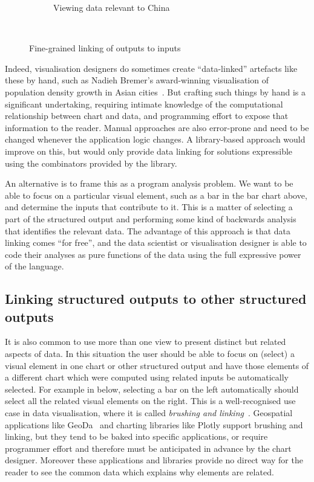 \begin{figure}[H]
\begin{subfigure}[b]{0.45\textwidth}
      \caption{Viewing data relevant to China}
   \end{subfigure}\\
   \begin{subfigure}{0.65\textwidth}
      \small
      
   \end{subfigure}
   \caption{Fine-grained linking of outputs to inputs}
   \label{fig:introduction:data-linking}
\end{figure}

Indeed, visualisation designers do sometimes create ``data-linked'' artefacts like these by hand, such as Nadieh Bremer's award-winning visualisation of population density growth in Asian cities~\cite{bremer15}. But crafting such things by hand is a significant undertaking, requiring intimate knowledge of the computational relationship between chart and data, and programming effort to expose that information to the reader. Manual approaches are also error-prone and need to be changed whenever the application logic changes. A library-based approach would improve on this, but would only provide data linking for solutions expressible using the combinators provided by the library.

An alternative is to frame this as a program analysis problem. We want to be able to focus on a particular visual element, such as a bar in the bar chart above, and determine the inputs that contribute to it. This is a matter of selecting a part of the structured output and performing some kind of backwards analysis that identifies the relevant data. The advantage of this approach is that data linking comes ``for free'', and the data scientist or visualisation designer is able to code their analyses as pure functions of the data using the full expressive power of the language.

\subsection{Linking structured outputs to other structured outputs}

 It is also common to use more than one view to present distinct but related aspects of data. In this situation the user should be able to focus on (select) a visual element in one chart or other structured output and have those elements of a different chart which were computed using related inputs be automatically selected. For example in  below, selecting a bar on the left automatically should select all the related visual elements on the right. This is a well-recognised use case in data visualisation, where it is called \emph{brushing and linking}~\cite{becker87}. Geospatial applications like GeoDa~\cite{anselin06} and charting libraries like Plotly support brushing and linking, but they tend to be baked into specific applications, or require programmer effort and therefore must be anticipated in advance by the chart designer. Moreover these applications and libraries provide no direct way for the reader to see the common data which explains why elements are related.

